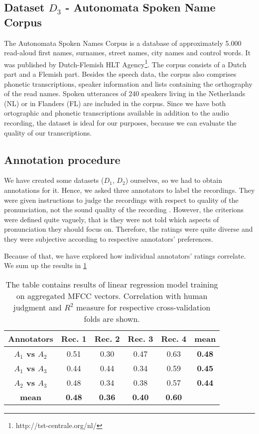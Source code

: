 \subsection{Dataset \textbf{$D_3$} - Autonomata Spoken Name Corpus}
The Autonomata Spoken Names Corpus \cite{van2008autonomata} is a database of approximately 5.000 read-aloud first names, surnames, street names, city names and control words.
It was  published by Dutch-Flemish HLT Agency\footnote{http://tst-centrale.org/nl/}.
The corpus consists of a Dutch part and a Flemish part.
Besides the speech data, the corpus also comprises phonetic transcriptions, speaker information and lists containing the orthography of the read names.
Spoken utterances of 240 speakers living in the Netherlands (NL) or in Flanders (FL) are included in the corpus.
Since we have both ortographic and phonetic transcriptions available in addition to the audio recording, the dataset is ideal for our purposes, because we can evaluate the quality of our transcriptions.
\subsection{Annotation procedure}
We have created some datasets ($D_1$, $D_2$) ourselves, so we had to obtain annotations for it.
Hence, we asked three annotators to label the recordings.
They were given instructions to judge the recordings with respect to quality of the pronunciation, not the sound quality of the recording .
However, the criterions were defined quite vaguely, that is they were not told which aspects of pronunciation they should focus on.
Therefore, the ratings were quite diverse and they were subjective according to respective annotators' preferences.
\par
Because of that, we have explored how individual annotators' ratings correlate.
We sum up the results in \ref{annotators}
\begin{table}
\begin{center}
\begin{tabular}{ |c|c|c|c|c|c| } 
 \hline
 \textbf{Annotators} & \textbf{Rec. 1} & \textbf{Rec. 2} & \textbf{Rec. 3} & \textbf{Rec. 4} & \textbf{mean} \\ \hline
\textbf{$A_1$ vs $A_2$} & 0.51 & 0.30 & 0.47 & 0.63 & \textbf{0.48} \\ \hline
\textbf{$A_1$ vs $A_3$} & 0.44 & 0.44 & 0.34 & 0.59 & \textbf{0.45} \\ \hline 
\textbf{$A_2$ vs $A_3$} & 0.48 & 0.34 & 0.38 & 0.57 & \textbf{0.44} \\ \hline 
\textbf{mean} & \textbf{0.48} & \textbf{0.36} & \textbf{0.40} & \textbf{0.60} &  \\ \hline 
 \end{tabular}
\end{center}
\label{annotators}
\caption{The table contains results of linear regression model training on aggregated MFCC vectors. Correlation with human judgment and $R^2$ measure for respective cross-validation folds are shown.}
\end{table}

